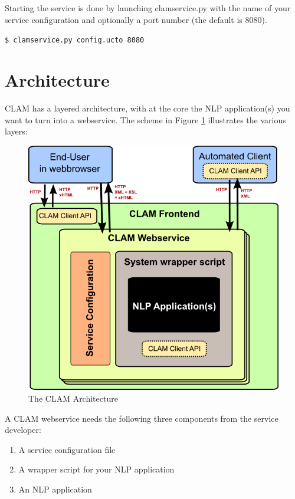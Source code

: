 \documentclass[a4paper,12pt]{report}
\begin{document}
Starting the service is done by launching clamservice.py with the name of your service configuration and optionally a port number (the default is 8080).

\texttt{\$ clamservice.py config.ucto 8080}

\section{Architecture}

CLAM has a layered architecture, with at the core the NLP application(s) you want to turn into a webservice. The scheme in Figure \ref{fig:arch} illustrates the various layers: 

\begin{figure}[h]
\begin{center}
\includegraphics[width=130.0mm]{architecture.png}
\end{center}
\caption{The CLAM Architecture}
\label{fig:arch} 
\end{figure}

A CLAM webservice needs the following three components from the service developer:

\begin{enumerate}
\item A service configuration file
\item A wrapper script for your NLP application
\item An NLP application
\end{enumerate}
\end{document}
